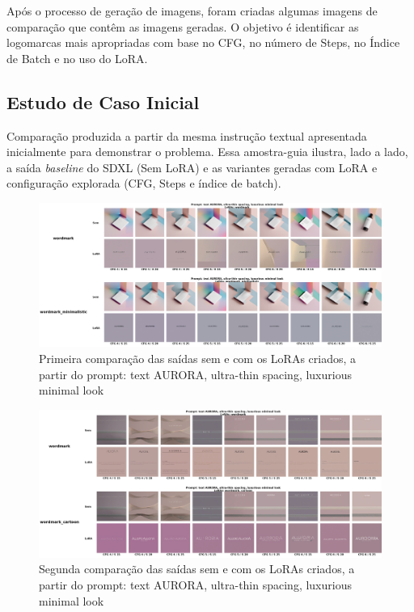 \documentclass[12pt, %
openright, 
oneside, %
a4paper,    %
brazil]{facom-ufu-abntex2}
\begin{document}
Após o processo de geração de imagens, foram criadas algumas imagens de comparação que contêm as imagens geradas. O objetivo é identificar as logomarcas mais apropriadas com base no CFG, no número de Steps, no Índice de Batch e no uso do LoRA.

\subsection{Estudo de Caso Inicial}

Comparação produzida a partir da mesma instrução textual apresentada inicialmente para demonstrar o problema. Essa amostra-guia ilustra, lado a lado, a saída \textit{baseline} do SDXL (Sem LoRA) e as variantes geradas com LoRA e configuração explorada (CFG, Steps e índice de batch).

\begin{figure}[H]
    \centering
	\includegraphics[width=\linewidth]{figuras/resultados/good/wordmark/cmp_p2_batch1.png}
	\caption[Primeira comparação das saídas sem e com os LoRAs criados, a partir do prompt ``AURORA''.]{Primeira comparação das saídas sem e com os LoRAs criados, a partir do prompt: text AURORA, ultra-thin spacing, luxurious minimal look}
	\label{fig:cmpP2Batch1}
\end{figure}

\begin{figure}[H]
    \centering
	\includegraphics[width=\linewidth]{figuras/resultados/good/wordmark/cmp_p2_batch3.png}
	\caption[Segunda comparação das saídas sem e com os LoRAs criados, a partir do prompt ``AURORA''.]{Segunda comparação das saídas sem e com os LoRAs criados, a partir do prompt: text AURORA, ultra-thin spacing, luxurious minimal look}
	\label{fig:cmpP2Batch3}
\end{figure}
\end{document}
